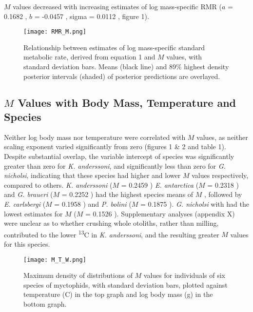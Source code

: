 \documentclass[12pt, titlepage]{article}
\begin{document}
$M$ values decreased with increasing estimates of log mass-specific RMR ($a$ = 0.1682 , $b$ = -0.0457 , sigma = 0.0112 , figure 1). 


\begin{figure}[H]
\texttt{[image: RMR\_M.png]}
\caption{Relationship between estimates of log mass-specific standard metabolic rate, derived from equation 1 and $M$ values, with standard deviation bars. Means (black line) and 89\% highest density posterior intervals (shaded) of posterior predictions are overlayed.} %
\end{figure}

\pagebreak
\subsection{$M$ Values with Body Mass, Temperature and Species}

Neither log body mass nor temperature were correlated with $M$ values, as neither scaling exponent varied significantly from zero (figures 1 \& 2 and table 1).
Despite substantial overlap, the variable intercept of species was significantly greater than zero for \textit{K. anderssoni}, and significantly less than zero for \textit{G. nicholsi}, indicating that these species had higher and lower $M$ values respectively, compared to others.
\textit{K. anderssoni} ($M$ = 0.2459 ) \textit{E. antarctica} ($M$ = 0.2318 ) and \textit{G. braueri} ($M$ = 0.2252 ) had the highest species means of $M$ , followed by \textit{E. carlsbergi} ($M$ = 0.1958 ) and \textit{P. bolini} ($M$ = 0.1875 ).
\textit{G. nicholsi} with had the lowest estimates for $M$ ($M$ = 0.1526 ).
Supplementary analyses (appendix X) %
were unclear as to whether crushing whole otoliths, rather than milling, contributed to the lower \textdelta \textsuperscript{13}C in \textit{K. anderssoni}, and the resulting greater $M$ values for this species.

\begin{figure}[H]
\texttt{[image: M\_T\_W.png]}
\caption{Maximum density of distributions of $M$ values for individuals of six species of myctophids, with standard deviation bars, plotted against temperature (\textdegree C) in the top graph and log body mass (g) in the bottom graph. } %
\end{figure}
\end{document}
